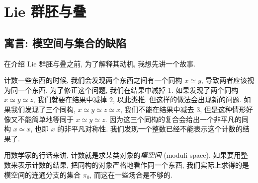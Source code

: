 \documentclass{article}
\theoremstyle{definition}
\begin{document}
	\section{Lie 群胚与叠}
	
	\subsection{寓言: 模空间与集合的缺陷}
	
	在介绍 Lie 群胚与叠之前, 为了解释其动机, 我想先讲一个故事.
%	
%	
%	
%	
	
	计数一些东西的时候, 我们会发现两个东西之间有一个同构 $x\simeq y$, 导致两者应该视为同一个东西. 为了修正这个问题, 我们在结果中减掉 1.
	如果发现了两个同构 $x\simeq y\simeq z$, 我们就要在结果中减掉 $2$, 以此类推. 但这样的做法会出现新的问题. 如果我们发现了三个同构, $x\simeq y\simeq z\simeq x$, 我们不能在结果中减去 $3$, 但是这种情形好像又不能简单地等同于 $x\simeq y\simeq z$. 因为这三个同构的复合会给出一个非平凡的同构 $x\simeq x$, 也即 $x$ 的非平凡对称性. 我们发现一个整数已经不能表示这个计数的结果了.
	
	用数学家的行话来讲, 计数就是求某类对象的\emph{模空间} (moduli space). 如果要用整数来表示计数的结果, 把同构的对象严格地看作同一个东西, 我们实际上求得的是模空间的连通分支的集合 $\pi_0$, 而这在一些场合是不够的.
	
\end{document}
